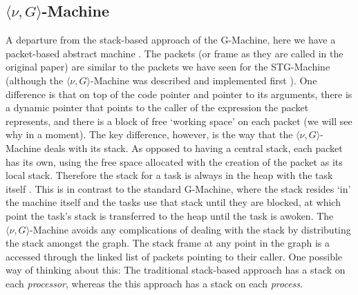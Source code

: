  \subsection{$\langle \nu , G\rangle $-Machine}
    A departure from the stack-based approach of the G-Machine, here we have a
packet-based abstract machine \cite{vGMachine, Alice}. 
    The packets (or frame as they are called in the
original paper) are similar to the packets we have seen for the STG-Machine
(although the $\langle \nu , G\rangle $-Machine was described and implemented
first \cite{vGMachine}). One difference is that on top of the code pointer and
pointer to its arguments, there is a dynamic pointer that points to the caller of
the expression the packet represents, and there is a block of free `working
space' on each packet (we will see why in a moment). 
The key difference, however, is the way that the 
$\langle \nu , G\rangle $-Machine deals with its stack.
As opposed to having a central stack, each packet has its own, using the free
space allocated with the creation of the packet as its local stack.
Therefore the stack for a task is always in
the heap with the task itself \cite{vGMachine}. This is in contrast to the standard
G-Machine, where the stack resides `in' the machine itself and the tasks use
that stack until they are blocked, at which point the task's stack is
transferred to the heap until the task is awoken. 
    The $\langle \nu , G\rangle $-Machine avoids any complications of dealing
with the stack by distributing the stack amongst the graph. The stack frame at
any point in the graph is a accessed through the linked list of packets pointing
to their caller. 
    One possible way of thinking about this: The traditional stack-based approach has a
stack on each \emph{processor}, whereas the this approach has a stack on
each \emph{process}.
